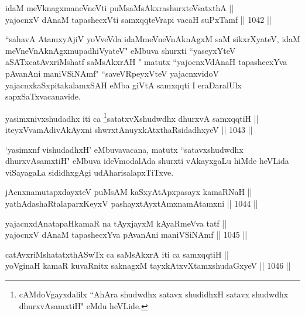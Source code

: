 
\begin{shl}
idaM meV\s knagxmaneVneVti puMsaMsAkxrashurxteVsatxthA || \\
yajocnxV dAnaM tapashecxVti samxqqteVrapi vacaH suPxTamf \hfill || 1042 || 
\end{shl}

\begin{artha}
``sahavA AtamxyAjiV yoVveVda idaMmeV\s neVnAknAgxM saM sikxrXyateV, idaM meV\s neVnAknAgxmupadhiVyateV" eMbuva shurxti ``yaseyxYteV aSATxcatAvxriMshatf saMsAkxrAH " matutx ``yajocnxVdAnaH tapashecxYva pAvanAni maniVSiNAmf" ``saveVRpeyxVteV yajacnxvidoV yajacnxkaSxpitakalamxSAH eMba giVtA samxqqti I eraDaralUlx sapxSaTxvacanavide.
\end{artha}



\begin{shl}
yasimxnivxshudadhx iti ca \footnote{cAMdoVgayxdalilx ``AhAra shudwdhx satavx shudidhxH satavx shudwdhx dhurxvAsamxtiH" eMdu heVLide.}satatxvXshudwdhx dhurxvA samxqqtiH || \\
iteyxVvamAdivAkAyxni shwrxtAnuyxkAtxthaRsidadhxyeV \hfill || 1043 ||  
\end{shl}

\begin{artha}
`yasimxnf vishudadhxH' eMbuvavacana, matutx ``satavxshudwdhx dhurxvAsamxtiH" eMbuva ideVmodalAda shurxti vAkayxgaLu hiMde heVLida viSayagaLa sididhxgAgi udAharisalapxTiTxve.
\end{artha}


\begin{shl}
jAcnxnamutapxdayxteV puMsAM kaSxyAtApxpasayx kamaRNaH || \\
yathA\s \s dashaRtalaparxKeyxV pashayxtAyxtAmxnamAtamxni \hfill || 1044 ||  
\end{shl}

\begin{shl}
yajacnxdAnatapaHkamaR na tAyxjayxM kAyaRmeVva tatf || \\
yajocnxV dAnaM tapashecxYva pAvanAni maniVSiNAmf \hfill || 1045 ||  
\end{shl}
				
\begin{shl}
catAvxriMshatatxthA\s SwTx ca saMsAkxrA iti ca samxqqtiH || \\
yoVginaH kamaR kuvaRnitx saknagxM tayxkAtxvX\s \s tamxshudaGxyeV \hfill || 1046 ||  
\end{shl}
				
